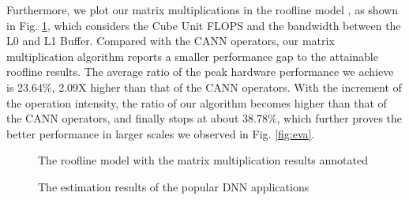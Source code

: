 \documentclass[12pt]{extbook}
\begin{document}
Furthermore, we plot our matrix multiplications in the roofline model \cite{DBLP:journals/cacm/WilliamsWP09}, as shown in Fig. \ref{fig:roofline}, which considers the Cube Unit FLOPS and the bandwidth between the L0 and L1 Buffer. Compared with the CANN operators, our matrix multiplication algorithm reports a smaller performance gap to the attainable roofline results. The average ratio of the peak hardware performance we achieve is 23.64\%, 2.09X higher than that of the CANN operators. With the increment of the operation intensity, the ratio of our algorithm becomes higher than that of the CANN operators, and finally stops at about 38.78\%, which further proves the better performance in larger scales we observed in Fig. \ref{fig:eva}.

\begin{figure}[tbp]
    \caption{The roofline model with the matrix multiplication results annotated}
    \label{fig:roofline}
    \end{figure}

\begin{figure}[tbp]
    \caption{The estimation results of the popular DNN applications}
    \label{fig:app_acc}
    \end{figure}
        
\end{document}
